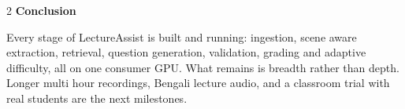 \documentclass[10pt,a4paper]{article}
\newcommand{\synsection}[1]{%
  \needspace{3\baselineskip}%
  \vspace{0.55em}\noindent\textbf{#1}\par\vspace{0.25em}}
\begin{document}
\begin{multicols}{2}
\synsection{Conclusion}

Every stage of LectureAssist is built and running: ingestion, scene aware
extraction, retrieval, question generation, validation, grading and
adaptive difficulty, all on one consumer GPU. What remains is breadth
rather than depth. Longer multi hour recordings, Bengali lecture audio,
and a classroom trial with real students are the next milestones.

\end{multicols}
\end{document}

